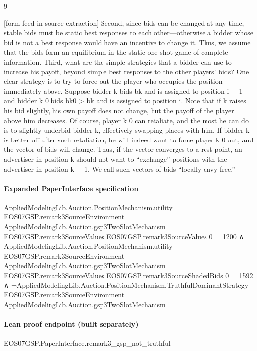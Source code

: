 \documentclass[10pt]{article}
\begin{document}
\begin{ReviewVerbatim}
9


[form-feed in source extraction]
Second, since bids can be changed at any time, stable bids must be static best responses to each
other—otherwise a bidder whose bid is not a best response would have an incentive to change
it. Thus, we assume that the bids form an equilibrium in the static one-shot game of complete
information. Third, what are the simple strategies that a bidder can use to increase his payoff,
beyond simple best responses to the other players’ bids?
One clear strategy is to try to force out the player who occupies the position immediately above.
Suppose bidder k bids bk and is assigned to position i + 1 and bidder k 0 bids bk0 > bk and is assigned
to position i. Note that if k raises his bid slightly, his own payoff does not change, but the payoff
of the player above him decreases. Of course, player k 0 can retaliate, and the most he can do is to
slightly underbid bidder k, effectively swapping places with him. If bidder k is better off after such
retaliation, he will indeed want to force player k 0 out, and the vector of bids will change. Thus,
if the vector converges to a rest point, an advertiser in position k should not want to “exchange”
positions with the advertiser in position k − 1. We call such vectors of bids “locally envy-free.”
\end{ReviewVerbatim}



\paragraph{Expanded PaperInterface specification}
\begin{ReviewVerbatim}
AppliedModelingLib.Auction.PositionMechanism.utility EOS07GSP.remark3SourceEnvironment
      AppliedModelingLib.Auction.gsp3TwoSlotMechanism EOS07GSP.remark3SourceValues EOS07GSP.remark3SourceValues 0 =
    1200 ∧
  AppliedModelingLib.Auction.PositionMechanism.utility EOS07GSP.remark3SourceEnvironment
        AppliedModelingLib.Auction.gsp3TwoSlotMechanism EOS07GSP.remark3SourceValues EOS07GSP.remark3SourceShadedBids
        0 =
      1592 ∧
    ¬AppliedModelingLib.Auction.PositionMechanism.TruthfulDominantStrategy EOS07GSP.remark3SourceEnvironment
        AppliedModelingLib.Auction.gsp3TwoSlotMechanism
\end{ReviewVerbatim}



\paragraph{Lean proof endpoint (built separately)}\begin{ReviewVerbatim}
EOS07GSP.PaperInterface.remark3_gsp_not_truthful
\end{ReviewVerbatim}
\end{document}
